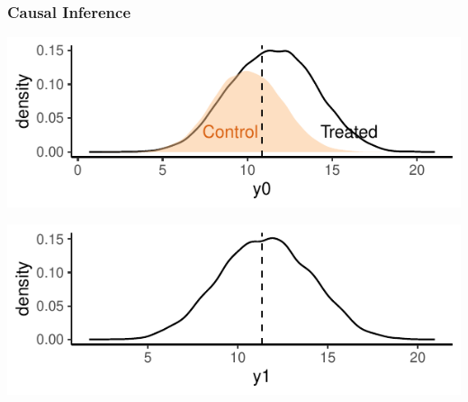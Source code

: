 \documentclass[xcolor=x11names,compress]{beamer}\usepackage[]{graphicx}\usepackage[]{color}
\makeatletter
\def\maxwidth{ %
  \ifdim\Gin@nat@width>\linewidth
    \linewidth
  \else
    \Gin@nat@width
  \fi
}
\newenvironment{knitrout}{}{} %
\renewcommand{\(}{\begin{columns}}
\renewcommand{\)}{\end{columns}}
\newcommand{\<}[1]{\begin{column}{#1}}
\renewcommand{\>}{\end{column}}
\makeatother
\begin{document}
\begin{frame}
\frametitle{Causal Inference}
\begin{knitrout}
\color{fgcolor}
\includegraphics[width=\maxwidth]{figure/OVB1b-1} 

\end{knitrout}

\begin{knitrout}
\color{fgcolor}
\includegraphics[width=\maxwidth]{figure/OVB2b-1} 

\end{knitrout}
\end{frame}
\end{document}
